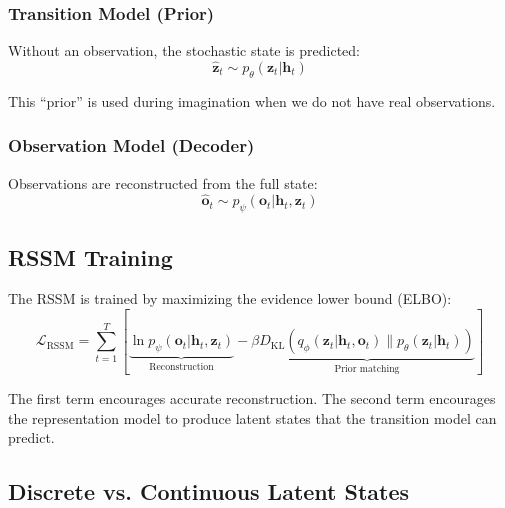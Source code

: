 \subsubsection{Transition Model (Prior)}

Without an observation, the stochastic state is predicted:
\begin{equation}
\hat{\mathbf{z}}_t \sim p_\theta(\mathbf{z}_t | \mathbf{h}_t)
\label{eq:rssm_prior}
\end{equation}

This ``prior'' is used during imagination when we do not have real observations.

\subsubsection{Observation Model (Decoder)}

Observations are reconstructed from the full state:
\begin{equation}
\hat{\mathbf{o}}_t \sim p_\psi(\mathbf{o}_t | \mathbf{h}_t, \mathbf{z}_t)
\label{eq:rssm_decoder}
\end{equation}

\subsection{RSSM Training}

The RSSM is trained by maximizing the evidence lower bound (ELBO):
\begin{equation}
\mathcal{L}_{\text{RSSM}} = \sum_{t=1}^T \left[ \underbrace{\ln p_\psi(\mathbf{o}_t | \mathbf{h}_t, \mathbf{z}_t)}_{\text{Reconstruction}} - \beta \underbrace{D_{\text{KL}}(q_\phi(\mathbf{z}_t | \mathbf{h}_t, \mathbf{o}_t) \| p_\theta(\mathbf{z}_t | \mathbf{h}_t))}_{\text{Prior matching}} \right]
\label{eq:elbo}
\end{equation}

The first term encourages accurate reconstruction. The second term encourages the representation model to produce latent states that the transition model can predict.


\subsection{Discrete vs. Continuous Latent States}

